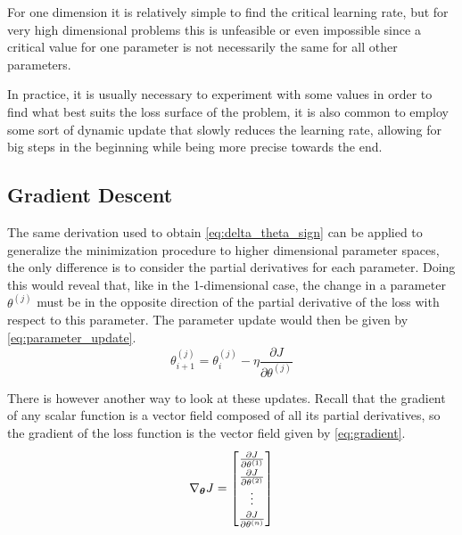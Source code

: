 For one dimension it is relatively simple to find the critical learning rate, but for very high dimensional problems this is unfeasible or even impossible since a critical value for one parameter is not necessarily the same for all other parameters.

In practice, it is usually necessary to experiment with some values in order to find what best suits the loss surface of the problem, it is also common to employ some sort of dynamic update that slowly reduces the learning rate, allowing for big steps in the beginning while being more precise towards the end.


\subsection{Gradient Descent} \label{sub:gradient_descent}
The same derivation used to obtain \autoref{eq:delta_theta_sign} can be applied to generalize the minimization procedure to higher dimensional parameter spaces, the only difference is to consider the partial derivatives for each parameter. Doing this would reveal that, like in the 1-dimensional case, the change in a parameter $\theta^{(j)}$ must be in the opposite direction of the partial derivative of the loss with respect to this parameter. The parameter update would then be given by \autoref{eq:parameter_update}.
\begin{equation} \label{eq:parameter_update}
    \theta_{i+1}^{(j)} = \theta_{i}^{(j)} - \eta \frac{\partial J}{\partial \theta^{(j)}}
\end{equation}

There is however another way to look at these updates. Recall that the gradient of any scalar function is a vector field composed of all its partial derivatives, so the gradient of the loss function is the vector field given by \autoref{eq:gradient}.
\begin{equation} \label{eq:gradient}
    \renewcommand{\arraystretch}{1.2}
    \nabla_{\bm{\theta}} J = \begin{bmatrix}
        \frac{\partial J}{\partial\theta^{(1)}} \\
        \frac{\partial J}{\partial\theta^{(2)}} \\
        \vdots \\
        \frac{\partial J}{\partial\theta^{(n)}}
    \end{bmatrix}
\end{equation}

